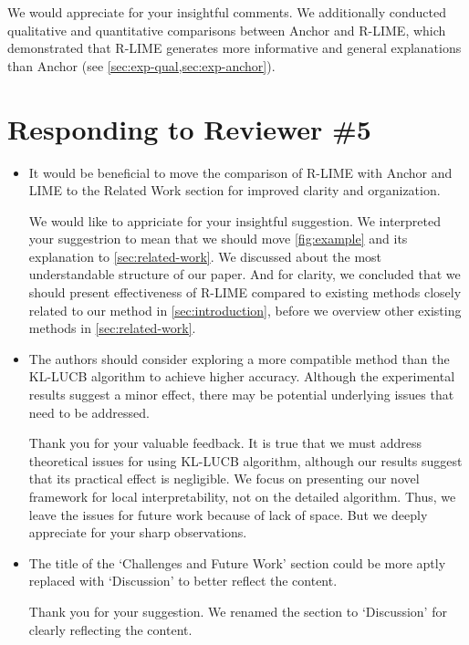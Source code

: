 \documentclass[runningheads]{llncs}
\begin{document}
\begin{mycomment}
  We would appreciate for your insightful comments.
  We additionally conducted qualitative and quantitative comparisons
  between Anchor and R-LIME,
  which demonstrated that R-LIME generates more informative and
  general explanations than Anchor (see \cref{sec:exp-qual,sec:exp-anchor}).
\end{mycomment}

\section*{Responding to Reviewer \#5}
\begin{itemize}
  \setlength{\itemsep}{15pt}
  \item It would be beneficial to move the comparison of R-LIME with Anchor
        and LIME to the Related Work section for improved clarity and
        organization.

        \begin{mycomment}
          We would like to appriciate for your insightful suggestion.
          We interpreted your suggestrion to mean that we should move
          \cref{fig:example} and its explanation to \cref{sec:related-work}.
          We discussed about the most understandable structure of our paper.
          And for clarity, we concluded that we should present effectiveness
          of R-LIME compared to existing methods closely related to our method
          in \cref{sec:introduction},
          before we overview other existing methods in \cref{sec:related-work}.
        \end{mycomment}

  \item The authors should consider exploring a more compatible method than the
        KL-LUCB algorithm to achieve higher accuracy. Although the experimental
        results suggest a minor effect, there may be potential underlying issues
        that need to be addressed.

        \begin{mycomment}
          Thank you for your valuable feedback.
          It is true that we must address theoretical issues for using
          KL-LUCB algorithm, although our results suggest that its practical
          effect is negligible.
          We focus on presenting our novel framework for local interpretability,
          not on the detailed algorithm.
          Thus, we leave the issues for future work because of lack of space.
          But we deeply appreciate for your sharp observations.
        \end{mycomment}

  \item The title of the `Challenges and Future Work' section could be more
        aptly replaced with `Discussion' to better reflect the content.

        \begin{mycomment}
          Thank you for your suggestion. We renamed the section to `Discussion'
          for clearly reflecting the content.
        \end{mycomment}
\end{itemize}
\end{document}
